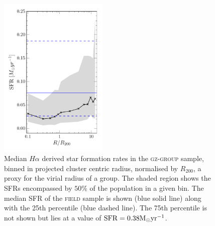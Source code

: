 \documentclass[useAMS,usenatbib]{mn2e}
\begin{document}
\begin{figure}
\includegraphics[width=0.46\textwidth]{sfr_trend_with_log_radius_field_matched_blue_dashed_hlines_gomez_03_rv_not_r200.pdf}
\caption{Median $H\alpha$ derived star formation rates in the \textsc{gz-group} sample, binned in projected cluster centric radius, normalised by $R_{200}$, a proxy for the virial radius of a group.  The shaded region shows the SFRs encompassed by $50\%$ of the population in a given bin. The median SFR of the \textsc{field} sample is shown (blue solid line) along with the 25th percentile (blue dashed line). The 75th percentile is not shown but lies at a value of $\rm{SFR} = 0.38 M_{\odot}\rm{yr}^{-1}$.}
\label{fig:sfrradius}
\end{figure}
\end{document}
